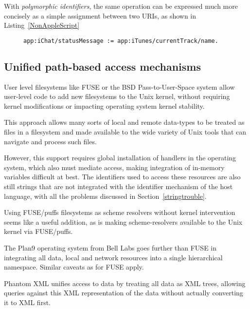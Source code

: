 \documentclass[preprint,authoryear]{acm_proc_article-sp}
\begin{document}
With \emph{polymorphic identifiers}, the same operation can be expressed
much more concisely as a simple assignment between two URIs,
as shown in Listing~\ref{NonAppleScript}


\begin{figure}[htbp]
\begin{lstlisting}[style=L,label=NonAppleScript,caption=Access to applications via \emph{polymorphic identifiers}.]
  app:iChat/statusMessage := app:iTunes/currentTrack/name.
\end{lstlisting}
\end{figure}


\subsection{Unified path-based access mechanisms}


User level filesystems like FUSE\cite{fuse} or the BSD Pass-to-User-Space\cite{puffs} 
system allow
user-level code to add new filesystems to the Unix kernel, without requiring
kernel modifications or impacting operating system kernel stability.

This approach allows many sorts of local and remote data-types to be 
treated as files in a filesystem and made available to the wide variety
of Unix tools that can navigate and process such files.  

However, this support requires global installation of handlers in the operating
system, which also must mediate access, making integration of in-memory 
variables difficult at best.  The identifiers used to access these resources
are also still strings that are not integrated with the identifier mechanism of
the host language, with all the problems discussed in Section~\ref{stringtrouble}.

Using FUSE/puffs filesystems as scheme resolvers without kernel intervention seems
like a useful addition, as is making scheme-resolvers available to the Unix kernel
via FUSE/puffs.

The Plan9\cite{plan9names}\cite{plan9network} operating system from Bell Labs goes further than FUSE in integrating
all data, local and network resources into a single hierarchical namespace.  Similar
caveats as for FUSE apply.

Phantom XML\cite{phantomxml} unifies access to data by treating all data as
XML trees, allowing queries against this XML representation of the data without
actually converting it to XML first.  
\end{document}
